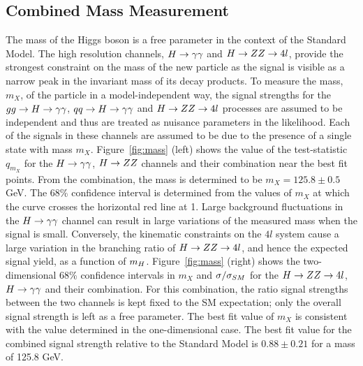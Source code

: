 \subsection{Combined Mass Measurement}
The mass of the Higgs boson is a free parameter in the context of the 
Standard Model. The high resolution channels, 
$H\rightarrow\gamma\gamma$ and $H\rightarrow ZZ \rightarrow 4l$, 
provide the strongest constraint on the mass of the new particle as the signal
is visible as a narrow peak in the invariant mass of its decay products.
To measure the mass, $m_{X}$, of the particle in a model-independent way,
the signal strengths for the $gg\rightarrow H\rightarrow\gamma\gamma$, $qq\rightarrow H\rightarrow\gamma\gamma$
and $H\rightarrow ZZ\rightarrow 4l$ processes are assumed to be independent and thus are treated as 
nuisance parameters in the likelihood. Each of the signals in these channels
are assumed to be due to the presence of a single state with mass $m_{X}$.
Figure~\ref{fig:mass} (left) shows the value of the test-statistic 
$q_{m_{X}}$ for the $H\rightarrow\gamma\gamma$, $H\rightarrow ZZ$ channels and their combination near the
best fit points. From the combination, the mass is determined to be $m_{X}=125.8 \pm 0.5$ GeV.
The 68\% confidence interval is determined
from the values of $m_{X}$ at which the curve crosses the horizontal red line at 1.
Large background fluctuations in the $H\rightarrow\gamma\gamma$ channel can result in
large variations of the measured mass when the signal is small.  
Conversely, the kinematic constraints on the $4l$ system cause a large variation in
the branching ratio of $H\rightarrow ZZ \rightarrow 4l$, and hence the expected signal yield, 
as a function of $m_{H}$.
Figure~\ref{fig:mass} (right) shows the two-dimensional 68\% confidence intervals
in $m_{X}$ and $\sigma/\sigma_{SM}$ for the $H\rightarrow ZZ\rightarrow 4l$, $H\rightarrow\gamma\gamma$ and their combination.
For this combination, the ratio signal strengths between the two channels is
kept fixed to the SM expectation; only the overall signal strength is left as a 
free parameter.  The best fit value of $m_{X}$ is consistent with the 
value determined in the one-dimensional case. 
The best fit value for the combined signal strength relative to the 
Standard Model is $0.88\pm0.21$ for a mass of 125.8 GeV.


